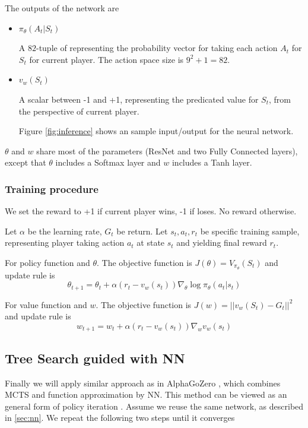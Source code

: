 \documentclass{article}
\begin{document}
The outputs of the network are 
\begin{itemize}
  \item
    $\pi_{\theta} (A_t|S_t)$

    A $82$-tuple of representing the probability vector for taking each action $A_t$ for $S_t$ for current player. The action space size is $9 ^2 + 1 = 82$.

  \item
    $v_w(S_t)$

    A scalar between -1 and +1, representing the predicated value for $S_t$, from the perspective of current player.

    Figure \ref{fig:inference} shows an sample input/output for the neural network.
\end{itemize}

$\theta$ and $w$ share most of the parameters (ResNet and two Fully Connected layers), except that $\theta$ includes a Softmax layer and $w$ includes a Tanh layer.


\subsubsection{Training procedure}
We set the reward to +1 if current player wins, -1 if loses. No reward otherwise. 

Let $\alpha$ be the learning rate,  $G_t$ be return. Let $s_t, a_t, r_t$ be specific training sample, representing player taking action $a_t$ at state $s_t$ and yielding final reward $r_t$.

For policy function and $\theta$. The objective function is  $J(\theta) = V_{\pi_{\theta}}(S_t)$ and update rule is
$$ \theta_{t+1} = \theta_{t} + \alpha 
( r_t  - v_w(s_t))
\nabla_{\theta} \log \pi_{\theta}(a_t|s_t) 
$$

For value function and $w$. The objective function is  $J(w) = ||v_w(S_t) - G_t||^2$ and update rule is 
$$ w_{t+1} = w_{t} + \alpha 
( r_t  - v_w(s_t))
\nabla_{w} v_w(s_t) 
$$
\subsection{Tree Search guided with NN}
Finally we will apply similar approach as in AlphaGoZero \cite{silver2017masteringalphagozero}, which combines MCTS and function approximation by NN. This method can be viewed as an general form of policy iteration \cite{sutton2018reinforcement}. Assume we reuse the same network, as described in \ref{sec:nn}. We repeat the following two steps until it converges
\end{document}
